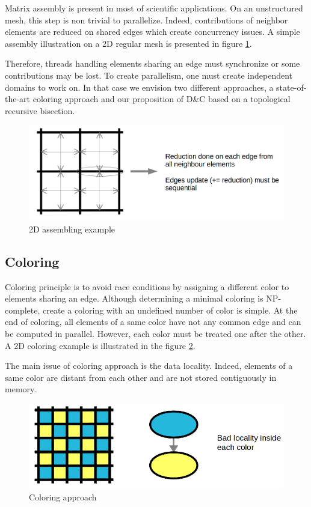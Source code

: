 \documentclass{IOS-Book-Article}
\begin{document}
Matrix assembly is present in most of scientific applications. On an unstructured mesh, this step is non trivial to parallelize.
Indeed, contributions of neighbor elements are reduced on shared edges which create concurrency issues.
A simple assembly illustration on a 2D regular mesh is presented in figure \ref{fig:2Dasm}.

Therefore, threads handling elements sharing an edge must synchronize or some contributions may be lost. To create parallelism, one must create independent domains to work on.
In that case we envision two different approaches, a state-of-the-art coloring approach and our proposition of D\&C based on a topological recursive bisection.
\begin{figure}[htp]
 \centering
 \includegraphics[scale=0.2]{2D_assembly.png}
 \caption{2D assembling example}
 \label{fig:2Dasm}
\end{figure}

\subsection{Coloring}
\label{sec:col}
Coloring principle is to avoid race conditions by assigning a different color to elements sharing an edge.
Although determining a minimal coloring is NP-complete, create a coloring with an undefined number of color is simple.
At the end of coloring, all elements of a same color have not any common edge and can be computed in parallel. However, each color must be treated one after the other.
A 2D coloring example is illustrated in the figure \ref{fig:colApp}.

The main issue of coloring approach is the data locality. Indeed, elements of a same color are distant from each other and are not stored contiguously in memory.
\begin{figure}[htp]
 \centering
 \includegraphics[scale=0.25]{Coloring_approach.png}
 \caption{Coloring approach}
 \label{fig:colApp}
\end{figure}
\end{document}

